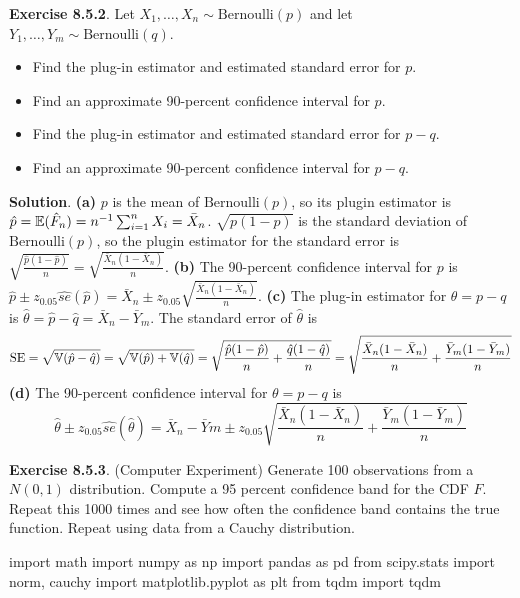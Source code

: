 \textbf{Exercise 8.5.2}. Let
\(X_{1}, \dots, X_{n} \sim \text{Bernoulli}(p)\) and let
\(Y_{1}, \dots, Y_m \sim \text{Bernoulli}(q)\).
\begin{itemize}[tightlist]
\item
  Find the plug-in estimator and estimated standard error for \(p\).
\item
  Find an approximate 90-percent confidence interval for \(p\).
\item
  Find the plug-in estimator and estimated standard error for \(p - q\).
\item
  Find an approximate 90-percent confidence interval for \(p - q\).
\end{itemize}

\textbf{Solution}.
\textbf{(a)}
\(p\) is the mean of \(\text{Bernoulli}(p)\), so its plugin estimator is
\(\hat{p} = \operatorname{\mathbb{E}}(\hat{F}_{n}) = n^{-1} \sum_{i=1}^{n} X_{i}  = \bar{X}_{n}\).
\(\sqrt{p(1-p)}\) is the standard deviation of \(\text{Bernoulli}(p)\),
so the plugin estimator for the standard error is
\(\sqrt{\frac{\hat{p}(1-\hat{p})}{n}} = \sqrt{\frac{\bar{X}_{n}(1 - \bar{X}_{n})}{n}}\).
\textbf{(b)}
The 90-percent confidence interval for \(p\) is
\(\hat{p} \pm z_{0.05} \hat{se}(\hat{p})= \bar{X}_{n} \pm z_{0.05} \sqrt{\frac{\bar{X}_{n}(1-\bar{X}_{n})}{n}}\).
\textbf{(c)}
The plug-in estimator for \(\theta = p - q\) is
\(\hat{\theta} = \hat{p} - \hat{q} = \bar{X}_{n} - \bar{Y}_m\).
The standard error of \(\hat{\theta}\) is
\[
\operatorname{\mathrm{SE}} = \sqrt{\operatorname{\mathbb{V}}(\hat{p} - \hat{q})} = \sqrt{\operatorname{\mathbb{V}}(\hat{p}) + \operatorname{\mathbb{V}}(\hat{q})} = \sqrt{\frac{\hat{p}(1 - \hat{p})}{n} + \frac{\hat{q}(1 - \hat{q})}{n}} = \sqrt{\frac{\bar{X}_{n}(1 - \bar{X}_{n})}{n} + \frac{\bar{Y}_m(1 - \bar{Y}_m)}{n}} 
\]
\textbf{(d)}
The 90-percent confidence interval for \(\theta = p - q\) is
\[
\hat{\theta} \pm z_{0.05} \hat{se}(\hat{\theta}) 
= \bar{X}_{n} -
\bar{Y}m \pm z_{0.05}
\sqrt{\frac{\bar{X}_{n}(1 - \bar{X}_{n})}{n} + \frac{\bar{Y}_m(1 - \bar{Y}_m)}{n}}
\]

\textbf{Exercise 8.5.3}. (Computer Experiment) Generate 100 observations
from a \(N(0, 1)\) distribution. Compute a 95 percent confidence band
for the CDF \(F\). Repeat this 1000 times and see how often the
confidence band contains the true function. Repeat using data from a
Cauchy distribution.

\begin{python}
import math
import numpy as np
import pandas as pd
from scipy.stats import norm, cauchy
import matplotlib.pyplot as plt
from tqdm import tqdm
\end{python}


